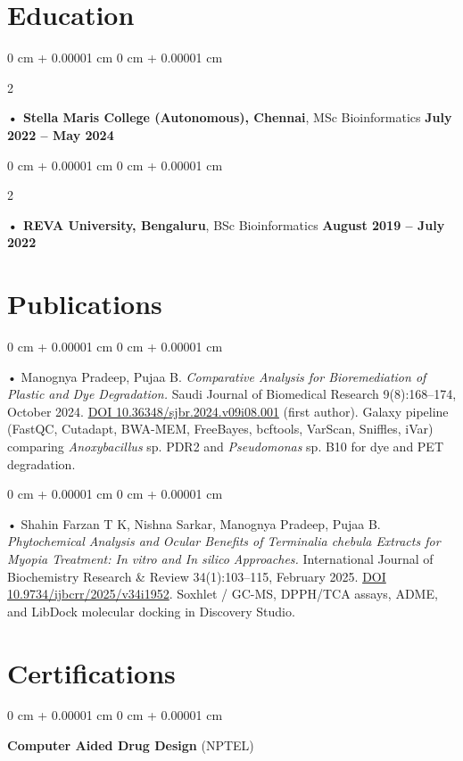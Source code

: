 \documentclass[10pt, letterpaper]{article}
\newenvironment{onecolentry}{
    \begin{adjustwidth}{
        0 cm + 0.00001 cm
    }{
        0 cm + 0.00001 cm
    }
}{
    \end{adjustwidth}
} %
\newenvironment{twocolentry}[2][]{
    \onecolentry
    \def\secondColumn{#2}
    \setcolumnwidth{\fill, 4.5 cm}
    \begin{paracol}{2}
}{
    \switchcolumn \raggedleft \secondColumn
    \end{paracol}
    \endonecolentry
} %
\begin{document}
    \vspace{2 pt }
        \section{Education}
        \vspace{2 pt }
        \begin{twocolentry}{
            \textbf{July 2022 -- May 2024}
        }
            \textbf{ • Stella Maris College (Autonomous), Chennai}, MSc Bioinformatics  \end{twocolentry}

        \begin{twocolentry}{
            \textbf{August 2019 -- July 2022}
        }
            \textbf{ • REVA University, Bengaluru}, BSc Bioinformatics  \end{twocolentry}

    \vspace{2 pt }
        \section{Publications}
        \vspace{2 pt }
        \begin{onecolentry}
             • Manognya Pradeep, Pujaa B. \textit{Comparative Analysis for Bioremediation of Plastic and Dye Degradation.} Saudi Journal of Biomedical Research 9(8):168--174, October 2024. \href{https://doi.org/10.36348/sjbr.2024.v09i08.001}{DOI 10.36348/sjbr.2024.v09i08.001} (first author). Galaxy pipeline (FastQC, Cutadapt, BWA-MEM, FreeBayes, bcftools, VarScan, Sniffles, iVar) comparing \textit{Anoxybacillus} sp. PDR2 and \textit{Pseudomonas} sp. B10 for dye and PET degradation.
        \end{onecolentry}
        \begin{onecolentry}
             • Shahin Farzan T K, Nishna Sarkar, Manognya Pradeep, Pujaa B. \textit{Phytochemical Analysis and Ocular Benefits of Terminalia chebula Extracts for Myopia Treatment: In vitro and In silico Approaches.} International Journal of Biochemistry Research \& Review 34(1):103--115, February 2025. \href{https://doi.org/10.9734/ijbcrr/2025/v34i1952}{DOI 10.9734/ijbcrr/2025/v34i1952}. Soxhlet / GC-MS, DPPH/TCA assays, ADME, and LibDock molecular docking in Discovery Studio.
        \end{onecolentry}

    \vspace{2 pt }
        \section{Certifications}
        \vspace{2 pt }
        \begin{onecolentry}
                \textbf{Computer Aided Drug Design} (NPTEL)
        \end{onecolentry}
\end{document}

